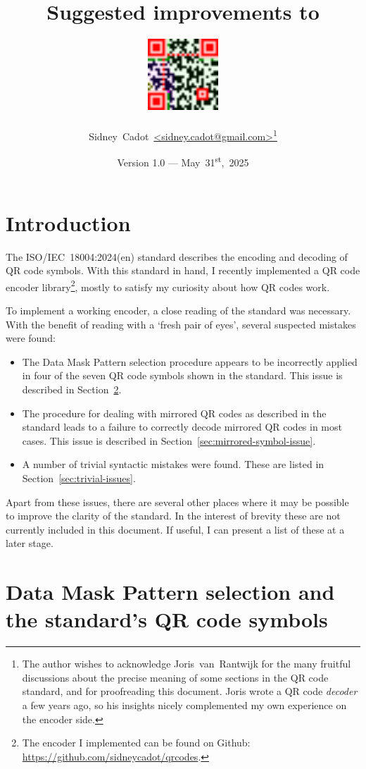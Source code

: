 \documentclass[a4paper,twoside]{article}
\title{Suggested improvements to \standard}
\author{\includegraphics[width=0.2\textwidth]{images/email.png} \\ \\ Sidney~Cadot~\url{<sidney.cadot@gmail.com>}\footnote{The author wishes to acknowledge Joris~van~Rantwijk for the many fruitful discussions about the
precise meaning of some sections in the QR code standard, and for proofreading this document. Joris wrote a QR code \emph{decoder} a few years ago, so his insights nicely complemented my own experience on the encoder side.}}
\date{Version 1.0 --- May~31\textsuperscript{st},~2025}
\newcommand{\shortstandard}{ISO/IEC~18004}
\newcommand{\standard}{\shortstandard:2024(en)}
\begin{document}
%
\maketitle
\tableofcontents
%
\section{Introduction}

The \standard{} standard describes the encoding and decoding of QR code symbols. With this standard in hand,
I recently implemented a QR code encoder library\footnote{The encoder I implemented can be found on Github:
\url{https://github.com/sidneycadot/qrcodes}.}, mostly to satisfy my curiosity about how QR codes work.

To implement a working encoder, a close reading of the standard was necessary. With the benefit of reading
with a `fresh pair of eyes', several suspected mistakes were found:

\begin{itemize}
\item The Data Mask Pattern selection procedure appears to be incorrectly applied in four of the seven
      QR code symbols shown in the standard.
      This issue is described in Section~\ref{sec:data-mask-pattern-selection}.
\item The procedure for dealing with mirrored QR codes as described in the standard leads to a failure
      to correctly decode mirrored QR codes in most cases.
      This issue is described in Section~\ref{sec:mirrored-symbol-issue}.
\item A number of trivial syntactic mistakes were found.
      These are listed in Section~\ref{sec:trivial-issues}.
\end{itemize}

Apart from these issues, there are several other places where it may be possible to improve the clarity
of the standard. In the interest of brevity these are not currently included in this document. If useful,
I can present a list of these at a later stage.


\section{Data Mask Pattern selection and the standard's QR code symbols}
\label{sec:data-mask-pattern-selection}
\end{document}
